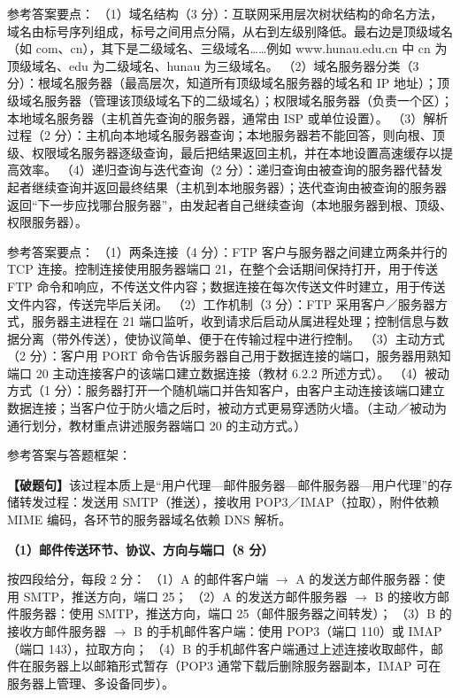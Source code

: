 \documentclass[a4paper,11pt]{article}
\begin{document}
\q 参考答案要点：
（1）域名结构（3 分）：互联网采用层次树状结构的命名方法，域名由标号序列组成，标号之间用点分隔，从右到左级别降低。最右边是顶级域名（如 com、cn），其下是二级域名、三级域名……例如 www.hunau.edu.cn 中 cn 为顶级域名、edu 为二级域名、hunau 为三级域名。
（2）域名服务器分类（3 分）：根域名服务器（最高层次，知道所有顶级域名服务器的域名和 IP 地址）；顶级域名服务器（管理该顶级域名下的二级域名）；权限域名服务器（负责一个区）；本地域名服务器（主机首先查询的服务器，通常由 ISP 或单位设置）。
（3）解析过程（2 分）：主机向本地域名服务器查询；本地服务器若不能回答，则向根、顶级、权限域名服务器逐级查询，最后把结果返回主机，并在本地设置高速缓存以提高效率。
（4）递归查询与迭代查询（2 分）：递归查询由被查询的服务器代替发起者继续查询并返回最终结果（主机到本地服务器）；迭代查询由被查询的服务器返回“下一步应找哪台服务器”，由发起者自己继续查询（本地服务器到根、顶级、权限服务器）。

\q 参考答案要点：
（1）两条连接（4 分）：FTP 客户与服务器之间建立两条并行的 TCP 连接。控制连接使用服务器端口 21，在整个会话期间保持打开，用于传送 FTP 命令和响应，不传送文件内容；数据连接在每次传送文件时建立，用于传送文件内容，传送完毕后关闭。
（2）工作机制（3 分）：FTP 采用客户／服务器方式，服务器主进程在 21 端口监听，收到请求后启动从属进程处理；控制信息与数据分离（带外传送），使协议简单、便于在传输过程中进行控制。
（3）主动方式（2 分）：客户用 PORT 命令告诉服务器自己用于数据连接的端口，服务器用熟知端口 20 主动连接客户的该端口建立数据连接（教材 6.2.2 所述方式）。
（4）被动方式（1 分）：服务器打开一个随机端口并告知客户，由客户主动连接该端口建立数据连接；当客户位于防火墙之后时，被动方式更易穿透防火墙。（主动／被动为通行划分，教材重点讲述服务器端口 20 的主动方式。）


\q 参考答案与答题框架：

\textbf{【破题句】}该过程本质上是“用户代理—邮件服务器—邮件服务器—用户代理”的存储转发过程：发送用 SMTP（推送），接收用 POP3／IMAP（拉取），附件依赖 MIME 编码，各环节的服务器域名依赖 DNS 解析。

\textbf{（1）邮件传送环节、协议、方向与端口（8 分）}
\begin{analysis}
按四段给分，每段 2 分：
（1）A 的邮件客户端 $\rightarrow$ A 的发送方邮件服务器：使用 SMTP，推送方向，端口 25；
（2）A 的发送方邮件服务器 $\rightarrow$ B 的接收方邮件服务器：使用 SMTP，推送方向，端口 25（邮件服务器之间转发）；
（3）B 的接收方邮件服务器 $\rightarrow$ B 的手机邮件客户端：使用 POP3（端口 110）或 IMAP（端口 143），拉取方向；
（4）B 的手机邮件客户端通过上述连接收取邮件，邮件在服务器上以邮箱形式暂存（POP3 通常下载后删除服务器副本，IMAP 可在服务器上管理、多设备同步）。
\end{analysis}
\end{document}
